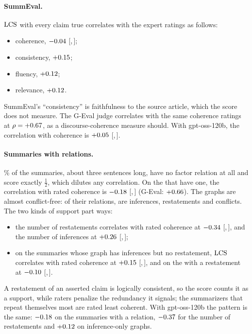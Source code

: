 \paragraph{SummEval.} $\mathrm{LCS}$ with every claim true correlates with the expert ratings as follows:
\begin{itemize}[leftmargin=1.2em,itemsep=1pt,topsep=2pt]
\item coherence, $-0.04$ {\scriptsize[\extSeRhoCohGptLo,\,\extSeRhoCohGptHi]};
\item consistency, $+0.15$;
\item fluency, $+0.12$;
\item relevance, $+0.12$.
\end{itemize}
SummEval's ``consistency'' is faithfulness to the source article, which the score does not
measure. The G-Eval judge correlates with the same coherence ratings at
$\rho=+0.67$, as a discourse-coherence measure should. With gpt-oss-120b, the
correlation with coherence is $+0.05$
{\scriptsize[\extSeRhoCohOssLo,\,\extSeRhoCohOssHi]}.

\paragraph{Summaries with relations.} \extSeEmptyGpt\% of the summaries, about three sentences
long, have no factor relation at all and score exactly $\frac12$, which dilutes any correlation.
On the \extSeNonEmptyNGpt{} that have one, the correlation with rated coherence is
$-0.18$ {\scriptsize[\extSeNonEmptyRhoCohGptLo,\,\extSeNonEmptyRhoCohGptHi]}
(G-Eval: $+0.66$). The graphs are almost conflict-free: of their
\extSeRelAllGpt{} relations, \extSeRelInferenceGpt{} are inferences, \extSeRelRestatementGpt{}
restatements and \extSeRelConflictGpt{} conflicts. The two kinds of support part ways:
\begin{itemize}[leftmargin=1.2em,itemsep=1pt,topsep=2pt]
\item the number of restatements correlates with rated coherence at
  $-0.34$ {\scriptsize[\extSeCountRestateRhoCohGptLo,\,\extSeCountRestateRhoCohGptHi]},
  and the number of inferences at $+0.26$
  {\scriptsize[\extSeCountInfRhoCohGptLo,\,\extSeCountInfRhoCohGptHi]};
\item on the \extSeInfOnlyNGpt{} summaries whose graph has inferences but no restatement, $\mathrm{LCS}$
  correlates with rated coherence at $+0.15$
  {\scriptsize[\extSeInfOnlyRhoCohGptLo,\,\extSeInfOnlyRhoCohGptHi]}, and on the
  \extSeRestateNGpt{} with a restatement at $-0.10$
  {\scriptsize[\extSeRestateRhoCohGptLo,\,\extSeRestateRhoCohGptHi]}.
\end{itemize}
A restatement of an asserted claim is logically consistent, so the score counts it as a support,
while raters penalize the redundancy it signals; the summarizers that repeat themselves most are
rated least coherent. With gpt-oss-120b the pattern is the same: $-0.18$ on the
\extSeNonEmptyNOss{} summaries with a relation, $-0.37$ for the number of
restatements and $+0.12$ on inference-only graphs.

